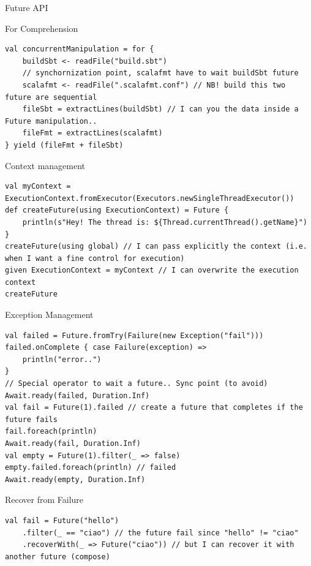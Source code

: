 \documentclass[presentation, 9pt]{beamer}\mode<presentation>{\usetheme{AMSBolognaFC}}
\begin{document}
\begin{frame}{Future API}
\begin{alertblock}{For Comprehension }
\begin{tcolorbox}[left=0pt, top=0pt, bottom=0pt]
\begin{verbatim}
val concurrentManipulation = for {
	buildSbt <- readFile("build.sbt")
	// synchornization point, scalafmt have to wait buildSbt future
	scalafmt <- readFile(".scalafmt.conf") // NB! build this two future are sequential
	fileSbt = extractLines(buildSbt) // I can you the data inside a Future manipulation..
	fileFmt = extractLines(scalafmt)
} yield (fileFmt + fileSbt)
					\end{verbatim}
				\end{tcolorbox}
\end{alertblock}
\begin{alertblock}{Context management}
		\begin{tcolorbox}[left=0pt, top=0pt, bottom=0pt]
						\begin{verbatim}
val myContext = ExecutionContext.fromExecutor(Executors.newSingleThreadExecutor())
def createFuture(using ExecutionContext) = Future {
	println(s"Hey! The thread is: ${Thread.currentThread().getName}")
}
createFuture(using global) // I can pass explicitly the context (i.e. when I want a fine control for execution)
given ExecutionContext = myContext // I can overwrite the execution context
createFuture
						\end{verbatim}
					\end{tcolorbox}
\end{alertblock}
\begin{alertblock}{Exception Management}
	\begin{tcolorbox}[left=0pt, top=0pt, bottom=0pt]
		\begin{verbatim}
val failed = Future.fromTry(Failure(new Exception("fail")))
failed.onComplete { case Failure(exception) =>
	println("error..")
}
// Special operator to wait a future.. Sync point (to avoid)
Await.ready(failed, Duration.Inf)
val fail = Future(1).failed // create a future that completes if the future fails
fail.foreach(println)
Await.ready(fail, Duration.Inf)
val empty = Future(1).filter(_ => false)
empty.failed.foreach(println) // failed
Await.ready(empty, Duration.Inf)
		\end{verbatim}
	\end{tcolorbox}
\end{alertblock}
\begin{alertblock}{Recover from Failure}
	\begin{tcolorbox}[left=0pt, top=0pt, bottom=0pt]
		\begin{verbatim}
val fail = Future("hello")
	.filter(_ == "ciao") // the future fail since "hello" != "ciao"
	.recoverWith(_ => Future("ciao")) // but I can recover it with another future (compose)

\end{verbatim}
\end{tcolorbox}
\end{alertblock}
\end{frame}
\end{document}
